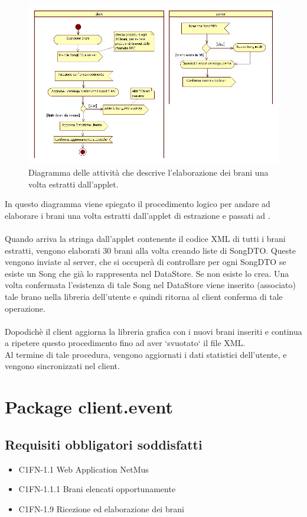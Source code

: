 \begin{figure}[!h]
  \centering
  \includegraphics[width=17cm]{img/DP/activity_elab_brani.png}
\caption{Diagramma delle attivit\`a che descrive l'elaborazione dei brani una
volta estratti dall'applet.}
\end{figure}

In questo diagramma viene spiegato il procedimento logico per andare ad
elaborare i brani una volta estratti dall'applet di estrazione e passati ad
.\\\\
Quando arriva la stringa dall'applet contenente il codice XML di tutti i brani
estratti, vengono elaborati 30 brani alla volta creando liste di SongDTO.
Queste vengono inviate al server, che si occuper\`a di controllare per ogni
SongDTO se esiste un Song che gi\`a lo rappresenta nel DataStore. Se non esiste
lo crea. Una volta confermata l'esistenza di tale Song nel DataStore viene
inserito (associato) tale brano nella libreria dell'utente e quindi ritorna al
client conferma di tale operazione.\\\\
Dopodich\`e il client aggiorna la libreria grafica con i nuovi brani inseriti e
continua a ripetere questo procedimento fino ad aver `svuotato` il file
XML.\\
Al termine di tale procedura, vengono aggiornati i dati statistici
dell'utente, e vengono sincronizzati nel client.

\newpage
\section{Package client.event}
\subsection*{Requisiti obbligatori soddisfatti}
\begin{itemize}
    \item C1FN-1.1 Web Application NetMus
    \item C1FN-1.1.1 Brani elencati opportunamente
    \item C1FN-1.9 Ricezione ed elaborazione dei brani
\end{itemize}
